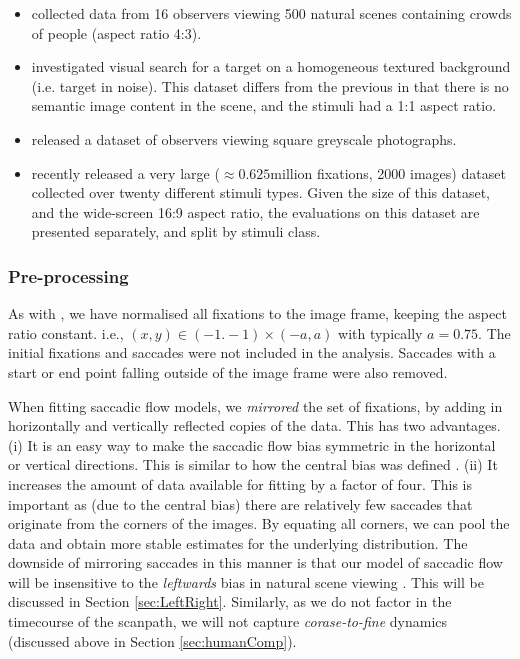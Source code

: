 \begin{itemize}

\item \cite{jiang2014} collected data from 16 observers viewing 500 natural scenes containing crowds of people (aspect ratio 4:3).

\item \cite{clarke2009} investigated visual search for a target on a homogeneous textured background (i.e. target in noise). This dataset differs from the previous in that there is no semantic image content in the scene, and the stimuli had a 1:1 aspect ratio.

\item \cite{greene-wolfe2012} released a dataset of observers viewing square greyscale photographs.

\item \cite{borji2015} recently released a very large ($\approx 0.625$million fixations, 2000 images) dataset collected over twenty different stimuli types. Given the size of this dataset, and the wide-screen 16:9 aspect ratio, the evaluations on this dataset are presented separately, and split by stimuli class.

\end{itemize}


\subsubsection{Pre-processing}

As with \cite{clarke-tatler2014}, we have normalised all fixations to the image frame, keeping the aspect ratio constant. i.e., $(x,y)\in (-1.-1)\times(-a,a)$ with typically $a=0.75$. The initial fixations and saccades were not included in the analysis. Saccades with a start or end point falling outside of the image frame were also removed. 

When fitting saccadic flow models, we \textit{mirrored} the set of fixations, by adding in horizontally and vertically reflected copies of the data. This has two advantages. (i) It is an easy way to make the saccadic flow bias symmetric in the horizontal or vertical directions. This is similar to how the central bias was defined \cite{clarke-tatler2014}. (ii) It increases the amount of data available for fitting by a factor of four. This is important as (due to the central bias) there are relatively few saccades that originate from the corners of the images. By equating all corners, we can pool the data and obtain more stable estimates for the underlying distribution. The downside of mirroring saccades in this manner is that our model of saccadic flow will be insensitive to the \textit{leftwards} bias in natural scene viewing \citep{nuthmann-matthias2014}. This will be discussed in Section \ref{sec:LeftRight}. Similarly, as we do not factor in the timecourse of the scanpath, we will not capture \textit{corase-to-fine} dynamics (discussed above in Section \ref{sec:humanComp}).


